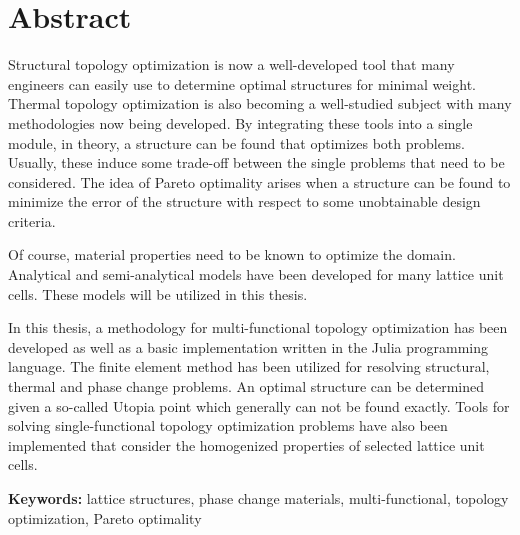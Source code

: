 \chapter*{Abstract}
Structural topology optimization is now a well-developed tool that many engineers can easily use to determine optimal structures for minimal weight. Thermal topology optimization is also becoming a well-studied subject with many methodologies now being developed. By integrating these tools into a single module, in theory, a structure can be found that optimizes both problems. Usually, these induce some trade-off between the single problems that need to be considered. The idea of Pareto optimality arises when a structure can be found to minimize the error of the structure with respect to some unobtainable design criteria. 

Of course, material properties need to be known to optimize the domain. Analytical and semi-analytical models have been developed for many lattice unit cells. These models will be utilized in this thesis.

In this thesis, a methodology for multi-functional topology optimization has been developed as well as a basic implementation written in the Julia programming language. The finite element method has been utilized for resolving structural, thermal and phase change problems. An optimal structure can be determined given a so-called Utopia point which generally can not be found exactly. Tools for solving single-functional topology optimization problems have also been implemented that consider the homogenized properties of selected lattice unit cells.

\textbf{Keywords:} lattice structures, phase change materials, multi-functional, topology optimization, Pareto optimality